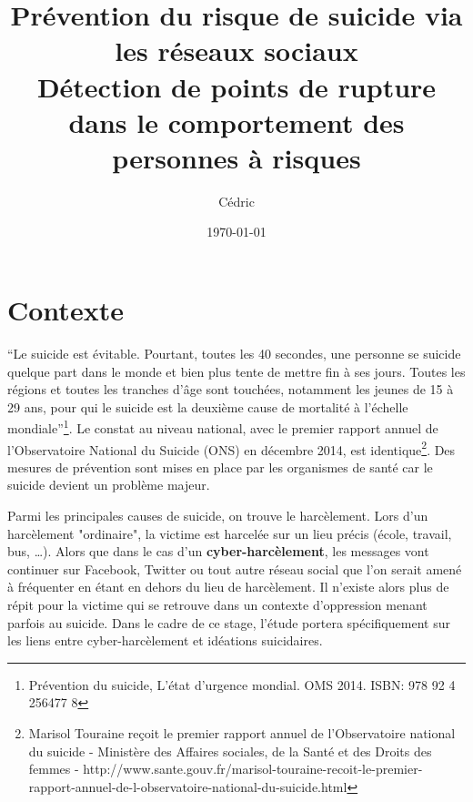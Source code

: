 \documentclass[utf8]{stageM2R} %
\author{Cédric \bsc{Maigrot}}
\title{Prévention du risque de suicide via les réseaux sociaux\\Détection de points de rupture dans le comportement des personnes à risques}
\date{\today}
\theoremstyle{remark}
\renewcommand{\emph}{\textbf}
\begin{document}
   
\frontmatter  %
\maketitle    %
\cleardoublepage   
\tableofcontents %
\mainmatter  %



\chapter{Contexte}
\enquote{Le suicide est évitable. Pourtant, toutes les 40 secondes, une personne se suicide quelque part dans le monde et bien plus tente de mettre fin à ses jours. Toutes les régions et toutes les  tranches d’âge sont touchées, notamment  les jeunes de 15 à 29 ans, pour qui le suicide est la deuxième cause de mortalité à l’échelle mondiale}\footnote{Prévention du suicide, L'état d'urgence mondial. OMS 2014. ISBN: 978 92 4 256477 8}. Le constat au niveau national, avec le premier rapport annuel de l'Observatoire National du Suicide (ONS) en décembre 2014, est identique\footnote{Marisol Touraine reçoit le premier rapport annuel de l'Observatoire national du suicide - Ministère des Affaires sociales, de la Santé et des Droits des femmes - http://www.sante.gouv.fr/marisol-touraine-recoit-le-premier-rapport-annuel-de-l-observatoire-national-du-suicide.html}. Des mesures de prévention sont mises en place par les organismes de santé car le suicide devient un problème majeur.

Parmi les principales causes de suicide, on trouve le harcèlement. Lors d'un harcèlement "ordinaire", la victime est harcelée sur un lieu précis (école, travail, bus, \dots). Alors que dans le cas d'un \emph{cyber-harcèlement}, les messages vont continuer sur  Facebook, Twitter ou tout autre réseau social que l'on serait amené à fréquenter en étant en dehors du lieu de harcèlement. Il n'existe alors plus de répit pour la victime qui se retrouve dans un contexte d'oppression menant parfois au suicide. Dans le cadre de ce stage, l'étude portera spécifiquement sur les liens entre cyber-harcèlement et idéations suicidaires.
\end{document}
